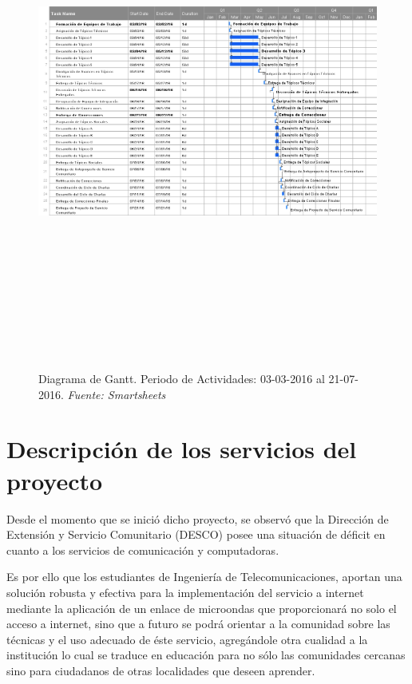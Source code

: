 \documentclass[11pt, a4paper, twosides]{report}
\begin{document}
 \begin{figure}[H]
 	\centering
 	\includegraphics[width=1\textwidth, height=17cm, angle=270]{fig3}
 	\caption{Diagrama de Gantt. Periodo de Actividades: 03-03-2016 al 21-07-2016. \textit{Fuente: Smartsheets}}
 \end{figure}
 
\chapter{Descripción de los servicios del\\ proyecto}
Desde el momento que se inició dicho proyecto, se observó que la Dirección de Extensión y Servicio Comunitario (DESCO) posee una situación de déficit en cuanto a los servicios de comunicación y computadoras.

Es por ello que los estudiantes de Ingeniería de Telecomunicaciones, aportan una solución robusta y efectiva para la implementación del servicio a internet mediante la aplicación de un enlace de microondas que proporcionará no solo el acceso a internet, sino que a futuro se podrá orientar a la comunidad sobre las técnicas y el uso adecuado de éste servicio, agregándole otra cualidad a la institución lo cual se traduce en educación para no sólo las comunidades cercanas sino para ciudadanos de otras localidades que deseen aprender.
\end{document}
